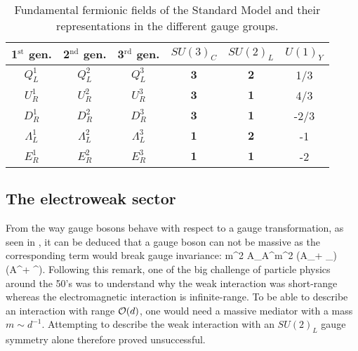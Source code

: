     \begin{table}
        \centering
        \begin{tabular}{|ccc||ccc|}
            \hline
            1$^\text{st}$ gen. & 2$^\text{nd}$ gen. & 3$^\text{rd}$ gen. & $SU(3)_C$    &  $SU(2)_L$    & $U(1)_Y$ \\
            \hline
            \hline
            $Q^1_L$            & $Q^2_L$            & $Q^3_L$            & $\mathbf{3}$ &  $\mathbf{2}$ &  1/3    \\
            $U^1_R$            & $U^2_R$            & $U^3_R$            & $\mathbf{3}$ &  $\mathbf{1}$ &  4/3    \\
            $D^1_R$            & $D^2_R$            & $D^3_R$            & $\mathbf{3}$ &  $\mathbf{1}$ & -2/3    \\
            \hline
            \hline
            $\Lambda^1_L$      & $\Lambda^2_L$      & $\Lambda^3_L$      & $\mathbf{1}$ &  $\mathbf{2}$ &  -1     \\
            $E^1_R$            & $E^2_R$            & $E^3_R$            & $\mathbf{1}$ &  $\mathbf{1}$ &  -2     \\
            \hline
        \end{tabular}
        \caption{Fundamental fermionic fields of the Standard Model and their representations
        in the different gauge groups.}
        \label{tab:StandardModelFields}
    \end{table}

    \subsection{The electroweak sector}

    From the way gauge bosons behave with respect to a gauge transformation, as
    seen in , it can be deduced that a
    gauge boson can not be massive as the corresponding term would break gauge
    invariance:
    {
        m^2 A_\mu A^\mu \neq m^2  (A_\mu +  \partial_\mu \theta)(A^\mu +  \partial^\mu \theta).
    }
    Following this remark, one of the big challenge of particle physics around
    the 50's was to understand why the weak interaction was short-range whereas
    the electromagnetic interaction is infinite-range. To be able to describe an
    interaction with range $\mathcal{O}(d)$, one would need a massive mediator with
    a mass $m \sim d^{-1}$. Attempting to describe the weak interaction with an
    $SU(2)_L$ gauge symmetry alone therefore proved unsuccessful.

